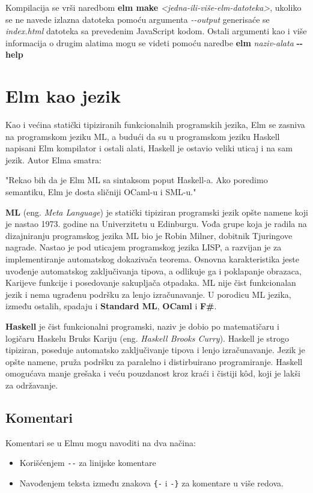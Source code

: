 \documentclass[12pt,oneside]{memoir}
\begin{document}
Kompilacija se vrši naredbom \textbf{elm make} \emph{<jedna-ili-više-elm-datoteka>},
ukoliko se ne navede izlazna datoteka pomoću argumenta \emph{-{}-output} generisaće 
se \emph{index.html} datoteka sa prevedenim JavaScript kodom. Ostali argumenti kao i
više informacija o drugim alatima mogu se videti pomoću naredbe \textbf{elm} 
\emph{naziv-alata} \textbf{-{}-help}

\section{Elm kao jezik}
Kao i većina statički tipiziranih funkcionalnih programskih jezika, Elm se zasniva na
programskom jeziku ML, a budući da su u programskom jeziku Haskell napisani Elm kompilator
i ostali alati, Haskell je ostavio veliki uticaj i na sam jezik. Autor Elma smatra:
\begin{displayquote}
"Rekao bih da je Elm ML sa sintaksom poput Haskell-a. Ako poredimo semantiku, Elm je
dosta sličniji OCaml-u i SML-u." \cite{eczaplicki:2015}
\end{displayquote}

\textbf{ML} (eng. \emph{Meta Language})\cite{ml} je statički tipiziran programski jezik opšte 
namene koji je nastao 1973. godine na Univerzitetu u Edinburgu. Vođa grupe koja je radila
na dizajniranju programskog jezika ML bio je Robin Milner, dobitnik Tjuringove nagrade.
Nastao je pod uticajem programskog jezika LISP, a razvijan je za implementiranje automatskog
dokazivača teorema. Osnovna karakteristika jeste uvođenje automatskog zaključivanja tipova, a
odlikuje ga i poklapanje obrazaca, Karijeve funkcije i posedovanje sakupljača otpadaka. ML
nije čist funkcionalan  jezik i nema ugrađenu podršku za lenjo izračunavanje. U porodicu ML 
jezika, između ostalih, spadaju i \textbf{Standard ML}, \textbf{OCaml} i \textbf{F{\#}}.


\textbf{Haskell}\cite{haskell} je čist funkcionalni programski, naziv je dobio po matematičaru i 
logičaru Haskelu Bruks Kariju (eng. \emph{Haskell Brooks Curry}). Haskell je strogo 
tipiziran, poseduje automatsko zaključivanje tipova i lenjo izračunavanje. Jezik je 
opšte namene, pruža podršku za paralelno i distirbuirano programiranje. Haskell 
omogućava manje grešaka i veću pouzdanost kroz kraći i čistiji k\^{o}d, koji je lakši za
održavanje. 


\subsection{Komentari}
Komentari se u Elmu mogu navoditi na dva načina: \begin{itemize}
  \item Korišćenjem \texttt{-{}-} za linijske komentare
  \item Navođenjem teksta između znakova \texttt{\{-} i \texttt{-\}} za komentare u više redova.    
\end{itemize}
\end{document}
